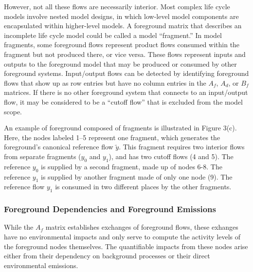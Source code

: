 However, not all these flows are necessarily interior.  Most complex life cycle models involve nested model designs, in which low-level model components are encapsulated within higher-level models.  A foreground matrix that describes an incomplete life cycle model could be called a model ``fragment.''  In model fragments, some foreground flows represent product flows consumed within the fragment but not produced there, or vice versa. These flows represent inputs and outputs to the foreground model that may be produced or consumed by other foreground systems.
Input/output flows can be detected by identifying foreground flows that show up as row entries but have no column entries in the $A_f$, $A_d$, or $B_f$ matrices.  If there is no other foreground system that connects to an input/output flow, it may be considered to be a ``cutoff flow'' that is excluded from the model scope.
%

An example of foreground composed of fragments is illustrated in Figure 3(c).  Here, the nodes labeled 1--5 represent one fragment, which generates the foreground's canonical reference flow $\tilde{y}$. This fragment requires two interior flows from separate fragments ($y_0$ and $y_1$), and has two cutoff flows (4 and 5).  The reference $y_0$ is supplied by a second fragment, made up of nodes 6-8.  The reference $y_1$ is supplied by another fragment made of only one node (9). The reference flow $y_1$ is consumed in two different places by the other fragments.


\subsubsection{Foreground Dependencies and Foreground Emissions}

While the $A_f$ matrix establishes exchanges of foreground flows, these exhanges have no environmental impacts and only serve to compute the activity levels of the foreground nodes themselves.  The quantifiable impacts from these nodes arise either from their dependency on background processes or their direct environmental emissions.  


